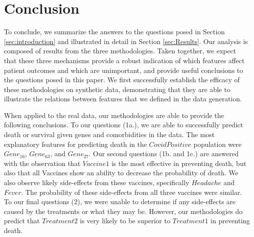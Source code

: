 \section{Conclusion}
\label{sec:conclusion}

To conclude, we summarize the answers to the questions posed in Section \ref{sec:introduction} and illustrated in detail in Section \ref{sec:Results}. Our analysis is composed of results from the three methodologies. Taken together, we expect that these three mechanisms provide a robust indication of which features affect patient outcomes and which are unimportant, and provide useful conclusions to the questions posed in this paper. We first successfully establish the efficacy of these methodologies on synthetic data, demonstrating that they are able to illustrate the relations between features that we defined in the data generation. 

When applied to the real data, our methodologies are able to provide the following conclusions. To our questions (1a.), we are able to successfully predict death or survival given genes and comorbidities in the data. The most explanatory features for predicting death in the $CovidPositive$ population were $Gene_{16}$, $Gene_{63}$, and $Gene_{27}$. Our second questions (1b. and 1c.) are answered with the observation that $Vaccine1$ is the most effective in preventing death, but also that all Vaccines show an ability to decrease the probability of death. We also observe likely side-effects from these vaccines, specifically $Headache$ and $Fever$. The probability of these side-effects from all three vaccines were similar. To our final questions (2), we were unable to determine if any side-effects are caused by the treatments or what they may be. However, our methodologies do predict that $Treatment2$ is very likely to be superior to $Treatment1$ in preventing death.
